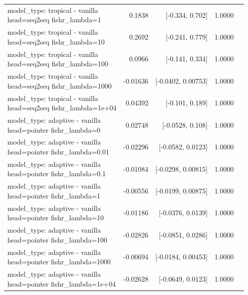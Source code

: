 \documentclass[10pt]{article}
\makeatletter
\newcommand{\stackcell}[1]{\begin{tabular}[t]{@{}l@{}}#1\end{tabular}}
\makeatother
\begin{document}
{\begin{longtable}{lrrrl}
\stackcell{model\_type: tropical - vanilla\\\footnotesize head=seq2seq fishr\_lambda=1 } & 0.1838 & [-0.334, 0.702] & 1.0000 & \\
\stackcell{model\_type: tropical - vanilla\\\footnotesize head=seq2seq fishr\_lambda=10 } & 0.2692 & [-0.241, 0.779] & 1.0000 & \\
\stackcell{model\_type: tropical - vanilla\\\footnotesize head=seq2seq fishr\_lambda=100 } & 0.0966 & [-0.141, 0.334] & 1.0000 & \\
\stackcell{model\_type: tropical - vanilla\\\footnotesize head=seq2seq fishr\_lambda=1000 } & -0.01636 & [-0.0402, 0.00753] & 1.0000 & \\
\stackcell{model\_type: tropical - vanilla\\\footnotesize head=seq2seq fishr\_lambda=1e+04 } & 0.04392 & [-0.101, 0.189] & 1.0000 & \\
\stackcell{model\_type: adaptive - vanilla\\\footnotesize head=pointer fishr\_lambda=0 } & 0.02748 & [-0.0528, 0.108] & 1.0000 & \\
\stackcell{model\_type: adaptive - vanilla\\\footnotesize head=pointer fishr\_lambda=0.01 } & -0.02296 & [-0.0582, 0.0123] & 1.0000 & \\
\stackcell{model\_type: adaptive - vanilla\\\footnotesize head=pointer fishr\_lambda=0.1 } & -0.01084 & [-0.0298, 0.00815] & 1.0000 & \\
\stackcell{model\_type: adaptive - vanilla\\\footnotesize head=pointer fishr\_lambda=1 } & -0.00556 & [-0.0199, 0.00875] & 1.0000 & \\
\stackcell{model\_type: adaptive - vanilla\\\footnotesize head=pointer fishr\_lambda=10 } & -0.01186 & [-0.0376, 0.0139] & 1.0000 & \\
\stackcell{model\_type: adaptive - vanilla\\\footnotesize head=pointer fishr\_lambda=100 } & -0.02826 & [-0.0851, 0.0286] & 1.0000 & \\
\stackcell{model\_type: adaptive - vanilla\\\footnotesize head=pointer fishr\_lambda=1000 } & -0.00694 & [-0.0184, 0.00453] & 1.0000 & \\
\stackcell{model\_type: adaptive - vanilla\\\footnotesize head=pointer fishr\_lambda=1e+04 } & -0.02628 & [-0.0649, 0.0123] & 1.0000 & \\

\end{longtable}}
\end{document}
